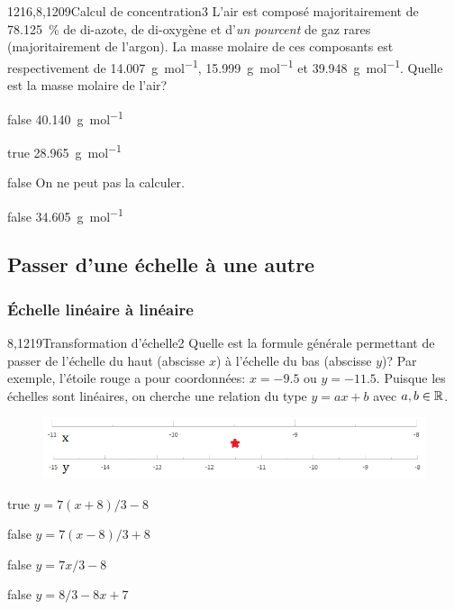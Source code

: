 \documentclass[11pt]{article}
\begin{document}
		\begin{question}{1216,8,1209}{Calcul de concentration}{3}{}
            L'air est composé majoritairement de \SI{78.125}{\percent} de di-azote, de di-oxygène et d'\emph{un pourcent} de gaz rares (majoritairement de l'argon). La masse molaire de ces composants est respectivement de \SI{14.007}{\gram\per\mol}, \SI{15.999}{\gram\per\mol} et \SI{39.948}{\gram\per\mol}. Quelle est la masse molaire de l'air?
        \end{question}
        \begin{reponses}
            \item[false] \SI{40.140}{\gram\per\mol}
		    \item[true] \SI{28.965}{\gram\per\mol}
		    \item[false] On ne peut pas la calculer.
		    \item[false] \SI{34.605}{\gram\per\mol}
        \end{reponses}
    
    \subsection{Passer d'une échelle à une autre}
        \subsubsection{Échelle linéaire à linéaire}
			\begin{question}{8,1219}{Transformation d'échelle}{2}{}
				Quelle est la formule générale permettant de passer de l'échelle du haut (abscisse $x$) à l'échelle du bas (abscisse $y$)? Par exemple, l'étoile rouge a pour coordonnées: $x=\num{-9.5}$ ou $y=\num{-11.5}$. Puisque les échelles sont linéaires, on cherche une relation du type $y = ax+b$ avec $a,b\in\mathbb {R} $.
				\begin{figure}
					\centering
					\includegraphics[scale=.75]{Antoine/Figures_Antoine/lin_-11_-8_to_lin_-15_-8_star_-9d5_-11d5.png}
				\end{figure}
			\end{question}
			\begin{reponses}
				\item[true] $y = 7(x+8)/3-8$
				\item[false] $y = 7(x-8)/3+8$
				\item[false] $y = 7x/3-8$
				\item[false] $y = 8/3-8x+7$
			\end{reponses}
		
\end{document}
